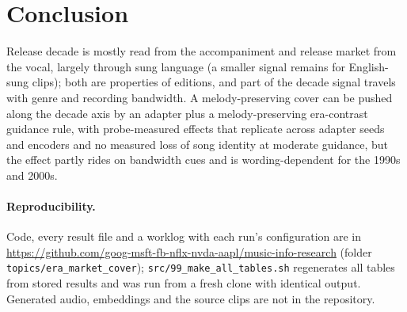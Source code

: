 \documentclass[10pt,twocolumn]{article}
\begin{document}
\section{Conclusion}
Release decade is mostly read from the accompaniment and release market from the vocal, largely through sung language (a smaller signal remains for English-sung clips); both are properties of editions, and part of the decade signal travels with genre and recording bandwidth. A melody-preserving cover can be pushed along the decade axis by an adapter plus a melody-preserving era-contrast guidance rule, with probe-measured effects that replicate across adapter seeds and encoders and no measured loss of song identity at moderate guidance, but the effect partly rides on bandwidth cues and is wording-dependent for the 1990s and 2000s.

\paragraph{Reproducibility.} Code, every result file and a worklog with each run's configuration are in \url{https://github.com/goog-msft-fb-nflx-nvda-aapl/music-info-research} (folder \texttt{topics/era\_market\_cover}); \texttt{src/99\_make\_all\_tables.sh} regenerates all tables from stored results and was run from a fresh clone with identical output. Generated audio, embeddings and the source clips are not in the repository.



\end{document}

